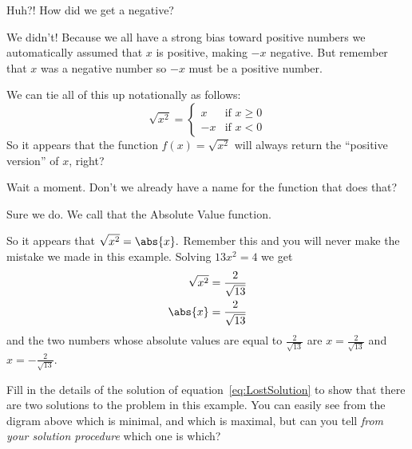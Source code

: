 \begin{myexample}
\begin{Digression}
    \alert{Huh?!} How did we get a negative?

    \alert{We didn't!} Because we all have a strong bias toward
    positive numbers we automatically assumed that $x$ is positive,
    making $-x$ negative. But remember that $x$ was a negative number so $-x$
    must be a positive number. 
    
    We can tie all of this up notationally as follows:
    \begin{equation}
      \sqrt{x^2}=
      \begin{cases}
        x& \text{if } x\ge 0\\
        -x& \text{if } x< 0
      \end{cases}\label{eq:SqrtSqr}  
    \end{equation}
    So it appears that the function $f(x)=\sqrt{x^2}$ will always return
    the ``positive version'' of $x$, right?

    Wait a moment. Don't we already have a name
    for the function that does that?

    Sure we do. We call that the Absolute Value function.

    So it appears that $\sqrt{x^2}=\abs{x}.$ Remember this and you will
    never make the mistake we made in this example. Solving $13x^2=4$  we get
    \begin{align*}
      \sqrt{x^2}&=\frac{2}{\sqrt{13}}\\
      \abs{x}&=\frac{2}{\sqrt{13}}
    \end{align*}
    and the two numbers whose absolute values are equal to
    $\frac{2}{\sqrt{13}}$ are $x=\frac{2}{\sqrt{13}}$ and
    $x=-\frac{2}{\sqrt{13}}.$
  \end{Digression}


  \begin{ProficiencyDrill}
    \label{problem:CircleDist2}
    Fill in the details of the solution of
    equation~\ref{eq:LostSolution} to show that there are two
    solutions to the problem in this example. You can easily see from
    the digram above which is minimal, and which is maximal, but can
    you tell \emph{from your solution procedure} which one is which?
  \end{ProficiencyDrill}
  

\end{myexample}
